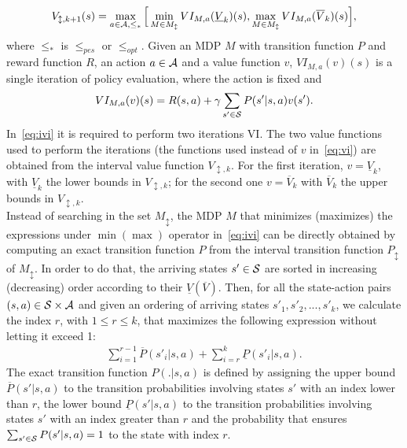 \begin{align}
V_{\updownarrow, k+1}(s) = \max_{a \in \mathcal{A}, \leq_{*}} \Big[ \min_{M \in M_{\updownarrow}} VI_{M, a}(\underline{V}_{k})(s), \max_{M \in M_{\updownarrow}} VI_{M, a}(\overline{V}_{k})(s) \Big], \label{eq:ivi}
\end{align}
where $\leq_{*}$ is $\leq_{pes}$ or $\leq_{opt}$. Given an \ac{MDP} $M$ with transition function $P$ and reward function $R$, an action $a \in \mathcal{A}$ and a value function $v$, $VI_{M, a}(v)(s)$ is a single iteration of policy evaluation, where the action is fixed and 
\begin{align} 
VI_{M, a}(v)(s) = R(s,a) + \gamma \sum_{s' \in \mathcal{S}} P(s'|s,a)v(s'). \label{eq:vi}
\end{align}
In~\eqref{eq:ivi} it is required to perform two iterations VI. The two value functions used to perform the iterations (\ie the functions used instead of $v$ in~\eqref{eq:vi}) are obtained from the interval value function $V_{\updownarrow, k}$. For the first iteration, $v = \underline{V}_{k}$, with $\underline{V}_{k}$ the lower bounds in $V_{\updownarrow, k}$; for the second one $v = \overline{V}_{k}$ with $\overline{V}_{k}$ the upper bounds in $V_{\updownarrow, k}$.\\
\newline
Instead of searching in the set $M_{\updownarrow}$, the \ac{MDP} $M$ that minimizes (maximizes) the expressions under $\min (\max)$ operator in~\eqref{eq:ivi} can be directly obtained by computing an exact transition function $P$ from the interval transition function $P_{\updownarrow}$ of $M_{\updownarrow}$. In order to do that, the arriving states $s' \in \mathcal{S}$ are sorted in increasing (decreasing) order according to their $\underline{V}(\overline{V})$. Then, for all the state-action pairs $(s,a) \in \mathcal{S} \times \mathcal{A}$ and given an ordering of arriving states $s'_1, s'_2, ..., s'_k$, we calculate the index $r$, with $1 \leq r \leq k$, that maximizes the following expression without letting it exceed 1:
\begin{align} \sum_{i=1}^{r-1}\overline{P}(s'_i|s,a) + \sum_{i=r}^{k}\underline{P}(s'_i|s,a). \end{align}
The exact transition function $P(.|s,a)$ is defined by assigning the upper bound $\overline{P}(s'|s,a)$ to the transition probabilities involving states $s'$ with an index lower than $r$, the lower bound $\underline{P}(s'|s,a)$ to the transition probabilities involving states $s'$ with an index greater than $r$ and the probability that ensures $\sum_{s' \in \mathcal{S}}P(s'|s,a) = 1$ to the state with index $r$.

